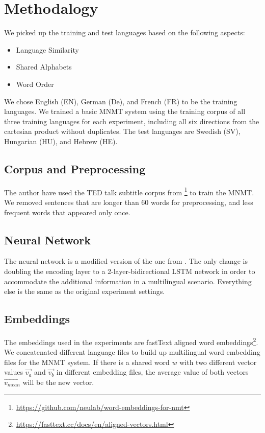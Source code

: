 \documentclass[11pt,a4paper]{article}
\begin{document}
\section{Methodalogy}

We picked up the training and test languages based on the following aspects:

\begin{itemize}
 \item Language Similarity
 \item Shared Alphabets
 \item Word Order
\end{itemize}

We chose English (EN), German (De), and French (FR) to be the training languages. We trained a basic MNMT system using the training corpus of all three training languages for each experiment, including all six directions from the cartesian product without duplicates. The test languages are Swedish (SV), Hungarian (HU), and Hebrew (HE).

\subsection{Corpus and Preprocessing}

The author have used the TED talk subtitle corpus from \citet{Qi:2018aa} \footnote{\url{https://github.com/neulab/word-embeddings-for-nmt}} to train the MNMT. We removed sentences that are longer than $60$ words for preprocessing, and less frequent words that appeared only once.

\subsection{Neural Network}

The neural network is a modified version of the one from \citet{Qi:2018aa}. The only change is doubling the encoding layer to a 2-layer-bidirectional LSTM network in order to accommodate the additional information in a multilingual scenario. Everything else is the same as the original experiment settings.

\subsection{Embeddings}

The embeddings used in the experiments are fastText aligned word embeddings\footnote{\url{https://fasttext.cc/docs/en/aligned-vectors.html}}. We concatenated different language files to build up multilingual word embedding files for the MNMT system. If there is a shared word $w$ with two different vector values $\vec{v_a}$ and $\vec{v_b}$ in different embedding files, the average value of both vectors $\vec{v_{mean}}$ will be the new vector.
\end{document}
